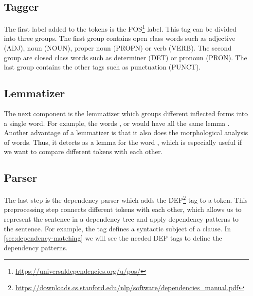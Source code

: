 \subsection{Tagger}\label{subsec:part-of-speech-tagging}
The first label added to the tokens is the \ac{POS}\footnote{\url{https://universaldependencies.org/u/pos/}} label.
This tag can be divided into three groups.
The first group contains open class words such as adjective (ADJ), noun (NOUN), proper noun (PROPN) or verb (VERB).
The second group are closed class words such as determiner (DET) or pronoun (PRON).
The last group contains the other tags such as punctuation (PUNCT).

\subsection{Lemmatizer}\label{subsec:lemmatizer}
The next component is the lemmatizer which groups different inflected forms into a single word.
For example, the words ,  or  would have all the same lemma .
Another advantage of a lemmatizer is that it also does the morphological analysis of words.
Thus, it detects  as a lemma for the word , which is especially useful if we want to compare different tokens with each other.

\subsection{Parser}\label{subsec:dependency}
The last step is the dependency parser which adds the \ac{DEP}\footnote{\url{https://downloads.cs.stanford.edu/nlp/software/dependencies_manual.pdf}} tag to a token.
This preprocessing step connects different tokens with each other, which allows us to represent the sentence in a dependency tree and apply dependency patterns to the sentence.
For example, the  tag defines a syntactic subject of a clause.
In \autoref{sec:dependency-matching} we will see the needed \ac{DEP} tags to define the dependency patterns.


